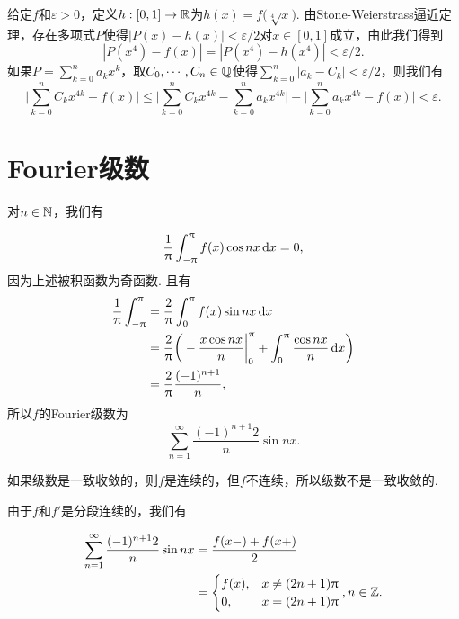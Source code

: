 \begin{ans}
  给定$f$和$\varepsilon>0$，定义$h:[0,1]\to\mathbb R$为$h(x)
  =f\big(\sqrt[4]{x}\big)$. 由Stone-Weierstrass逼近定理，存在多项式$P$使得$|P(x)-h(x)|<\varepsilon/2$对$x\in[0,1]$成立，由此我们得到
  \[
    | P(x^4)-f(x) | = |P(x^4)-h(x^4)| < \varepsilon/2.
  \]
  如果$P=\sum_{k=0}^na_kx^k$，取$C_0,\cdots,C_n\in\mathbb Q$使得$\sum_{k=0}^n|a_k-C_k|<\varepsilon/2$，则我们有
  \[
    \bigg|
      \sum_{k=0}^nC_kx^{4k} - f(x)
    \bigg| \le
    \bigg|
      \sum_{k=0}^nC_kx^{4k} - \sum_{k=0}^n a_kx^{4k}
    \bigg| +
    \bigg|
      \sum_{k=0}^na_kx^{4k} - f(x)
    \bigg| <\varepsilon.
  \]
\end{ans}

\section{Fourier级数}
\begin{ans}
  \begin{enumb}
    \item 对$n\in\mathbb N$，我们有
  \end{enumb}
    \[
      \frac1{\uppi}\int_{-\uppi}^\uppi f(x)\cos nx\,\mathrm dx = 0,
    \]
    因为上述被积函数为奇函数. 且有
    \begin{align*}
      \frac1{\uppi}\int_{-\uppi}^\uppi & = \frac2{\uppi}
      \int_0^\uppi f(x)\sin n x\,\mathrm dx \\
      & = \frac2{\uppi}\bigg(
        -\frac{x\cos nx}n\bigg|_0^\uppi  +
        \int_0^\uppi\frac{\cos nx}n\,\mathrm dx
      \bigg) \\
      & = \frac2{\uppi}\frac{(-1)^{n+1}}n,
    \end{align*}
    所以$f$的Fourier级数为
    \[ \sum_{n=1}^\infty \frac{(-1)^{n+1}2}n\sin nx. \]
    \begin{enumc}
     \setcounter{enumi}{1}
     \item 如果级数是一致收敛的，则$f$是连续的，但$f$不连续，所以级数不是一致收敛的.
     \item 由于$f$和$f'$是分段连续的，我们有
    \end{enumc}
      \begin{align*}
        \sum_{n=1}^\infty \frac{(-1)^{n+1}2}n\sin nx
        & = \frac{f(x-)+f(x+)}2 \\
        & = \begin{cases}
          f(x), & x\ne (2n+1)\uppi\\
          0, & x= (2n+1)\uppi
        \end{cases},n\in\mathbb Z.
      \end{align*}
\end{ans}

